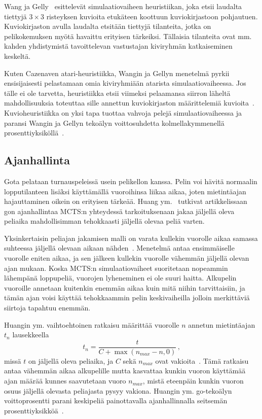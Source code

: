 \documentclass[12pt,finnish]{tktltiki2}
\theoremstyle{definition}
\theoremstyle{remark}
\begin{document}
Wang ja Gelly~\cite{wanggelly} esittelevät simulaatiovaiheen heuristiikan, joka etsii laudalta tiettyjä $3\times 3$ risteyksen kuvioita etukäteen koottuun kuviokirjastoon pohjautuen. Kuviokirjaston avulla laudalta etsitään tiettyjä tilanteita, jotka on pelikokemuksen myötä havaittu erityisen tärkeiksi. Tällaisia tilanteita ovat mm. kahden yhdistymistä tavoittelevan vastustajan kiviryhmän katkaiseminen keskeltä.

Kuten Cazenaven atari-heuristiikka, Wangin ja Gellyn menetelmä pyrkii ensisijaisesti pelastamaan omia kiviryhmiään atarista simulaatiovaiheessa. Jos tälle ei ole tarvetta, heuristiikka etsii viimeksi pelaamansa siirron läheltä mahdollisuuksia toteuttaa sille annettun kuviokirjaston määrittelemiä kuvioita~\cite{wanggelly}. Kuvioheuristiikka on yksi tapa tuottaa vahvoja pelejä simulaatiovaiheessa ja paransi Wangin ja Gellyn tekoälyn voittosuhdetta kolmellakymmenellä prosenttiyksiköllä~\cite{wanggelly}.


\subsection{Ajanhallinta}

Gota pelataan turnauspeleissä usein pelikellon kanssa. Pelin voi hävitä normaalin lopputilanteen lisäksi käyttämällä vuoroihinsa liikaa aikaa, joten mietintäajan hajauttaminen oikein on erityisen tärkeää. Huang ym.~\cite{huang} tutkivat artikkelissaan gon ajanhallintaa MCTS:n yhteydessä tarkoituksenaan jakaa jäljellä oleva peliaika mahdollisimman tehokkaasti jäljellä olevaa peliä varten.

Yksinkertaisin peliajan jakamisen malli on varata kullekin vuorolle aikaa samassa suhteessa jäljellä olevaan aikaan nähden~\cite{huang}. Menetelmä antaa ensimmäiselle vuorolle eniten aikaa, ja sen jälkeen kullekin vuorolle vähemmän jäljellä olevan ajan mukaan. Koska MCTS:n simulaatiovaiheet suoritetaan nopeammin lähempänä loppupeliä, vuorojen lyheneminen ei ole suuri haitta. Alkupelin vuoroille annetaan kuitenkin enemmän aikaa kuin mitä niihin tarvittaisiin, ja tämän ajan voisi käyttää tehokkaammin pelin keskivaiheilla jolloin merkittäviä siirtoja tapahtuu enemmän.

Huangin ym. vaihtoehtoinen ratkaisu määrittää vuorolle $n$ annetun mietintäajan $t_n$ lausekkeella
\begin{equation}
t_n = \frac{t}{C + \max(n_{max} - n, 0)}\,,
\end{equation}
missä $t$ on jäljellä oleva peliaika, ja $C$ sekä $n_{max}$ ovat vakioita~\cite{huang}. Tämä ratkaisu antaa vähemmän aikaa alkupelille mutta kasvattaa kunkin vuoron käyttämää ajan määrää kunnes saavutetaan vuoro $n_{max}$, mistä eteenpäin kunkin vuoron osuus jäljellä olevasta peliajasta pysyy vakiona. Huangin ym. go-tekoälyn voittoprosentti parani keskipeliä painottavalla ajanhallinnalla seitsemän prosenttiyksikköä~\cite{huang}.
\end{document}
